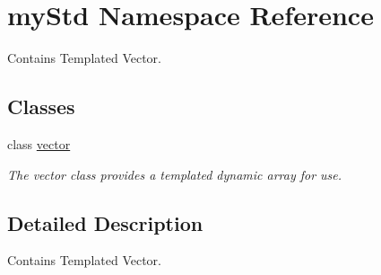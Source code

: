 \hypertarget{namespacemyStd}{}\section{my\+Std Namespace Reference}
\label{namespacemyStd}


Contains Templated Vector.  


\subsection*{Classes}
\begin{DoxyCompactItemize}
\item 
class \hyperlink{classmyStd_1_1vector}{vector}
\begin{DoxyCompactList}\small\item\em The vector class provides a templated dynamic array for use. \end{DoxyCompactList}\end{DoxyCompactItemize}


\subsection{Detailed Description}
Contains Templated Vector. 